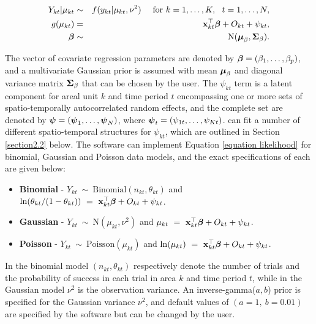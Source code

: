 \documentclass[article, nojss]{jss}
\newcommand{\bd}[1]{\ensuremath{\mbox{\boldmath $#1$}}}
\begin{document}
\begin{eqnarray}
Y_{kt}|\mu_{kt}&\sim&f(y_{kt}|\mu_{kt},\nu^{2})~~~~\mbox{for }k=1,\ldots,K,~~t=1,\ldots,N,\label{equation likelihood}\\
g(\mu_{kt})&=&\mathbf{x}_{kt}^{\top}\bd{\beta} + O_{kt} + \psi_{kt},\nonumber\\
\bd{\beta}&\sim&\mbox{N}(\bd{\mu}_{\beta}, \bd{\Sigma}_{\beta}).\nonumber
\end{eqnarray}

The vector of covariate regression parameters are denoted by $\bd{\beta}=(\beta_{1},\ldots,\beta_{p})$, and a multivariate Gaussian prior is assumed with mean $\bd{\mu}_{\beta}$ and diagonal variance matrix $\bd{\Sigma}_{\beta}$  that can be chosen by the user. The $\psi_{kt}$ term is a latent component for areal unit $k$ and time period $t$ encompassing one or more sets of spatio-temporally autocorrelated random effects, and the complete set are denoted by $\bd{\psi}=(\bd{\psi}_{1},\ldots,\bd{\psi}_{N})$, where $\bd{\psi}_{t}=(\psi_{1t},\ldots,\psi_{Kt})$.  can fit a number of different spatio-temporal structures for $\psi_{kt}$, which are outlined in Section \ref{section2.2} below. The software can implement Equation \ref{equation likelihood} for binomial, Gaussian and Poisson data models, and the exact specifications of each are given below:

\begin{itemize}
\item \textbf{Binomial} -  $Y_{kt}~\sim~\mbox{Binomial}(n_{kt}, \theta_{kt})$ and $\ln(\theta_{kt}/(1-\theta_{kt}))~=~\mathbf{x}_{kt}^{\top}\bd{\beta} + O_{kt} + \psi_{kt}$. 

\item \textbf{Gaussian} -  $Y_{kt}~\sim~\mbox{N}(\mu_{kt}, \nu^{2})$ and $\mu_{kt}~=~\mathbf{x}_{kt}^{\top}\bd{\beta} + O_{kt} + \psi_{kt}$. 

\item \textbf{Poisson} -  $Y_{kt}~\sim~\mbox{Poisson}(\mu_{kt})$ and $\ln(\mu_{kt})~=~\mathbf{x}_{kt}^{\top}\bd{\beta} + O_{kt} + \psi_{kt}$. 
\end{itemize}

In the binomial model $(n_{kt}, \theta_{kt})$ respectively denote the number of trials and the probability of success in each trial in area $k$ and time period $t$, while in the Gaussian model $\nu^2$ is the observation variance. An inverse-gamma($a,b$) prior is specified for the Gaussian variance $\nu^2$, and default values of $(a=1,~ b=0.01)$  are specified by the software but can be changed by the user.
\end{document}
